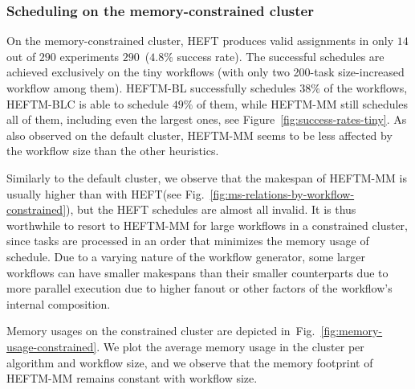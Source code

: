 \documentclass[conference]{IEEEtran}
\newcommand{\algo}[1]{\textsc{#1}}
\newcommand{\heft}{\algo{HEFT}\xspace}
\newcommand{\heftmm}{\algo{HEFTM-MM}\xspace}
\newcommand{\heftbl}{\algo{HEFTM-BL}\xspace}
\newcommand{\heftblc}{\algo{HEFTM-BLC}\xspace}
\newcommand{\new}[1]{{\color{blue}#1}}
\begin{document}
\subsubsection{Scheduling on the memory-constrained cluster}
\label{ss:mem-constrained-cluster}
%
On the memory-constrained cluster, \heft produces valid assignments in only $14$ out of $290$ experiments
$290$~($4.8\%$ success rate).
The successful schedules are achieved exclusively on the tiny workflows (with only two 200-task size-increased
workflow among them).
\heftbl successfully schedules $38\%$ of the workflows, \heftblc is able to schedule $49\%$ of them, while \heftmm
still schedules all of them, including even the largest ones, see Figure~\ref{fig:success-rates-tiny}.
As also observed on the default cluster, \heftmm seems to be less affected by the workflow size
than the other heuristics.

Similarly to the default cluster, we observe that the makespan of \heftmm is usually higher
than with \heft (see Fig.~\ref{fig:ms-relations-by-workflow-constrained}), but the \heft schedules are
almost all invalid. It is thus worthwhile to resort to \heftmm for large workflows
in a constrained cluster, since tasks are processed in an order that minimizes
the memory usage of schedule.
\new{Due to a varying nature of the workflow generator, some larger workflows can have smaller makespans than their
smaller counterparts due to more parallel execution due to higher fanout or other factors of the workflow's
internal composition.
}


%
%
%

Memory usages on the constrained cluster are depicted in~Fig.~\ref{fig:memory-usage-constrained}.
\new{We plot the average memory usage in the cluster per algorithm and workflow size},
and we observe that the memory footprint of \heftmm remains constant with workflow size.
\end{document}
